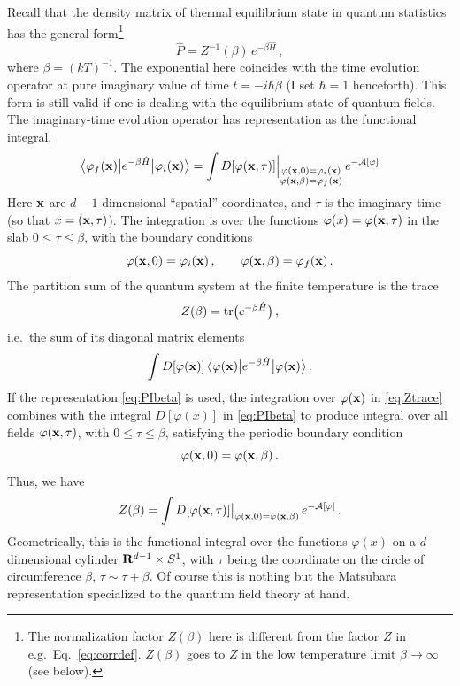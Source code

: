 Recall that the density matrix of thermal equilibrium state in quantum statistics
has the general form\footnote{The normalization factor $Z(\beta)$ here is different
from the factor $Z$ in e.g.\ Eq.~\eqref{eq:corrdef}. $Z(\beta)$ goes to $Z$ in the
low temperature limit $\beta\to\infty$ (see below).}
\begin{equation}\label{eq:density}
\hat P=Z^{-1}(\beta)\,e^{-\beta\hat H}\,,
\end{equation}
where $\beta=(kT)^{-1}$. The exponential here coincides with the time evolution
operator at pure imaginary value of time $t=-i\hbar\beta$ (I set $\hbar=1$
henceforth). This form is still valid if one is dealing with the equilibrium state
of quantum fields. The imaginary-time evolution operator has representation as the
functional integral,
\begin{equation}\label{eq:PIbeta}
\bigl\langle\varphi_f(\mathbf{x})\big|e^{-\beta\hat H}\big|\varphi_i(\mathbf{x})\bigr\rangle=\int D[\varphi(\mathbf{x},\tau)]\Big|_{\substack{\varphi(\mathbf{x},0)=\varphi_i(\mathbf{x})\\\varphi(\mathbf{x},\beta)=\varphi_f(\mathbf{x})}}\,e^{-\mathcal A[\varphi]}
\end{equation}
Here $\mathbf{x}$ are $d-1$ dimensional ``spatial'' coordinates, and $\tau$ is the
imaginary time (so that $x=(\mathbf{x},\tau)$). The integration is over the functions
$\varphi(x)=\varphi(\mathbf{x},\tau)$ in the slab $0\le\tau\le\beta$, with the boundary
conditions
\[
\varphi(\mathbf{x},0)=\varphi_i(\mathbf{x})\,,\qquad\varphi(\mathbf{x},\beta)=\varphi_f(\mathbf{x})\,.
\]
The partition sum of the quantum system at the finite temperature is the trace
\begin{equation}\label{eq:Zbeta}
Z(\beta)=\operatorname{tr}\bigl(e^{-\beta\hat H}\bigr)\,,
\end{equation}
i.e.\ the sum of its diagonal matrix elements
\begin{equation}\label{eq:Ztrace}
\int D[\varphi(\mathbf{x})]\,\bigl\langle\varphi(\mathbf{x})\big|e^{-\beta\hat H}\big|\varphi(\mathbf{x})\bigr\rangle\,.
\end{equation}
If the representation \eqref{eq:PIbeta} is used, the integration over
$\varphi(\mathbf{x})$ in \eqref{eq:Ztrace} combines with the integral $D[\varphi(x)]$ in
\eqref{eq:PIbeta} to produce integral over all fields $\varphi(\mathbf{x},\tau)$, with
$0\le\tau\le\beta$, satisfying the periodic boundary condition
\begin{equation}\label{eq:periodic}
\varphi(\mathbf{x},0)=\varphi(\mathbf{x},\beta)\,.
\end{equation}
Thus, we have
\begin{equation}\label{eq:Zcyl}
Z(\beta)=\int D[\varphi(\mathbf{x},\tau)]\big|_{\varphi(\mathbf{x},0)=\varphi(\mathbf{x},\beta)}\,e^{-\mathcal A[\varphi]}\,.
\end{equation}
Geometrically, this is the functional integral over the functions $\varphi(x)$ on a
$d$-dimensional cylinder $\mathbf{R}^{d-1}\times S^1$, with $\tau$ being the coordinate on
the circle of circumference $\beta$, $\tau\sim\tau+\beta$. Of course this is nothing
but the Matsubara representation specialized to the quantum field theory at hand.

